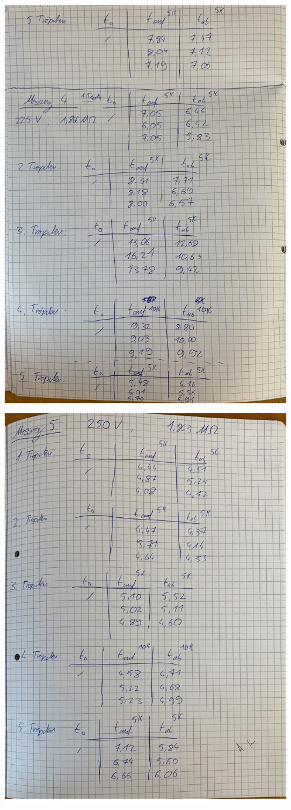 \newpage
\centering
\includegraphics[height=18cm]{content/pics/originaldaten/Originaldaten_4.pdf}
\newpage
\centering
\includegraphics[height=18cm]{content/pics/originaldaten/Originaldaten_5.pdf}